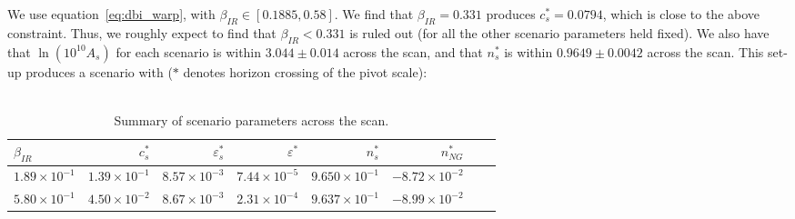     We use equation~\eqref{eq:dbi_warp}, with $\beta_{IR}\in[0.1885, 0.58]$.
    We find that $\beta_{IR}=0.331$ produces $c_s^{*}=0.0794$,
    which is close to the above constraint.
    Thus, we roughly expect to find that $\beta_{IR}<0.331$ is ruled out
    (for all the other scenario parameters held fixed).
    We also have that $\ln\left(10^{10}A_s\right)$ for each scenario
    is within $3.044\pm0.014$ across the scan,
    and that $n_s^{*}$ is within $0.9649\pm0.0042$ across the scan.
    This set-up produces a scenario with ($*$ denotes horizon crossing of the pivot scale):
    \\
    \\
\begin{table}[h!]
  \begin{center}
    \begin{tabular}{lrrrrrrr}
        \toprule
        $\beta_{IR}$ &    $c_s^{*}$ &  $\varepsilon_s^{*}$ &   $\varepsilon^{*}$ &   $n_s^{*}$ &  $n_{NG}^{*}$\\
        \midrule
        $1.89\times 10^{-1}$  &  $1.39\times 10^{-1}$  &  $  8.57\times 10^{-3}$  &  $7.44\times 10^{-5}$  &  $9.650\times 10^{-1}$  &  $-8.72\times 10^{-2}$\\
        $5.80\times 10^{-1}$  &  $4.50\times 10^{-2}$  &  $  8.67\times 10^{-3}$  &  $2.31\times 10^{-4}$  &  $9.637\times 10^{-1}$  &  $-8.99\times 10^{-2}$\\
        \bottomrule
    \end{tabular}
    \caption{Summary of scenario parameters across the scan.}\label{tab:scan_summary}
  \end{center}
\end{table}
